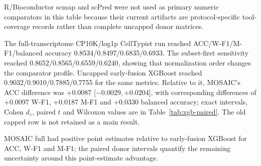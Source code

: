 \documentclass[10pt]{article}
\begin{document}
R/Bioconductor scmap and scPred were not used as primary numeric comparators in this table because their current artifacts are protocol-specific tool-coverage records rather than complete uncapped donor matrices.

\begin{table}[H]
\centering
\caption{Full-training published and strong ML baselines under the primary PBMC donor-disjoint L3 protocol. Values are donor means with 95\% confidence intervals across eight held-out donors. All listed baselines use the full six training donors in each fold and the complete held-out donor test set. The XGBoost rows are uncapped and use the declared 80-tree, depth-4 histogram configuration. The primary CellTypist-compatible row uses full-transcriptome-denominator CP10K followed by log1p before retaining the train-only 3,000-gene subset; the subset-first row is a sensitivity and neither row is presented as an unqualified fully native package-default reproduction.}
\label{tab:strong-ml-baselines}
\scriptsize
\setlength{\tabcolsep}{2.6pt}
\resizebox{\textwidth}{!}{%

}
\end{table}

The full-transcriptome CP10K/log1p CellTypist run reached ACC/W-F1/M-F1/balanced accuracy 0.8534/0.8497/0.6835/0.6933. The subset-first sensitivity reached 0.8652/0.8565/0.6559/0.6240, showing that normalization order changes the comparator profile. Uncapped early-fusion XGBoost reached 0.9032/0.9010/0.7885/0.7755 for the same metrics. Relative to it, MOSAIC's ACC difference was +0.0087 [$-0.0029,+0.0204$], with corresponding differences of +0.0097 W-F1, +0.0187 M-F1 and +0.0330 balanced accuracy; exact intervals, Cohen $d_z$, paired $t$ and Wilcoxon values are in Table~\ref{tab:xgb-paired}. The old capped row is not retained as a main result.

\begin{table}[H]
\centering
\caption{Paired donor comparison between MOSAIC full and the strongest full-training baseline, early-fusion XGBoost. Differences are MOSAIC minus XGBoost after averaging MOSAIC seeds within each held-out donor.}
\label{tab:xgb-paired}
\small
\resizebox{\textwidth}{!}{%

}
\end{table}

MOSAIC full had positive point estimates relative to early-fusion XGBoost for ACC, W-F1 and M-F1; the paired donor intervals quantify the remaining uncertainty around this point-estimate advantage.
\end{document}
